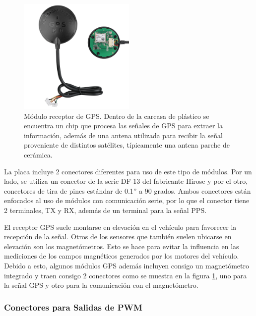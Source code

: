 \begin{figure}[htb]
    \centering
    \includegraphics[width=0.5\textwidth]{img/gps.png}
    \caption{Módulo receptor de GPS. Dentro de la carcasa de plástico se encuentra un chip que procesa las señales de GPS para extraer la información, además de una antena utilizada para recibir la señal proveniente de distintos satélites, típicamente una antena parche de cerámica.}
    \label{fig:gps}
\end{figure}

La placa incluye 2 conectores diferentes para uso de este tipo de módulos. Por un lado, se utiliza un conector de la serie DF-13 del fabricante Hirose y por el otro, conectores de tira de pines estándar de 0.1” a 90 grados. Ambos conectores están enfocados al uso de módulos con comunicación serie, por lo que el conector tiene 2 terminales, TX y RX, además de un terminal para la señal PPS.

El receptor GPS suele montarse en elevación en el vehículo para favorecer la recepción de la señal. Otros de los sensores que también suelen ubicarse en elevación son los magnetómetros. Esto se hace para evitar la influencia en las mediciones de los campos magnéticos generados por los motores del vehículo. Debido a esto, algunos módulos GPS además incluyen consigo un magnetómetro integrado y traen consigo 2 conectores como se muestra en la figura \ref{fig:gps}, uno para la señal GPS y otro para la comunicación con el magnetómetro.  


\subsubsection{Conectores para Salidas de PWM}

